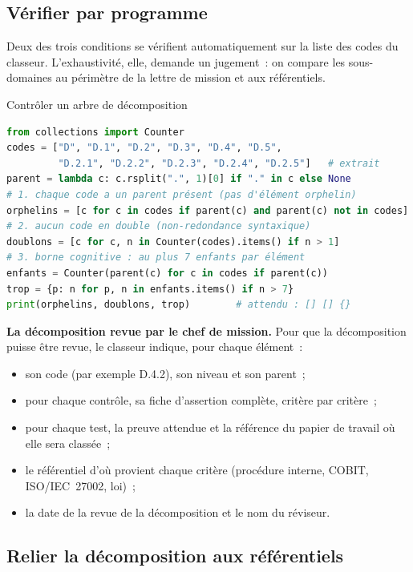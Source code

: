 \subsection{Vérifier par programme}

Deux des trois conditions se vérifient automatiquement sur la liste des
codes du classeur. L'exhaustivité, elle, demande un jugement~: on compare
les sous-domaines au périmètre de la lettre de mission et aux référentiels.

\begin{boxoutils}{Contrôler un arbre de décomposition}
\begin{lstlisting}[language=Python]
from collections import Counter
codes = ["D", "D.1", "D.2", "D.3", "D.4", "D.5",
         "D.2.1", "D.2.2", "D.2.3", "D.2.4", "D.2.5"]   # extrait
parent = lambda c: c.rsplit(".", 1)[0] if "." in c else None
# 1. chaque code a un parent présent (pas d'élément orphelin)
orphelins = [c for c in codes if parent(c) and parent(c) not in codes]
# 2. aucun code en double (non-redondance syntaxique)
doublons = [c for c, n in Counter(codes).items() if n > 1]
# 3. borne cognitive : au plus 7 enfants par élément
enfants = Counter(parent(c) for c in codes if parent(c))
trop = {p: n for p, n in enfants.items() if n > 7}
print(orphelins, doublons, trop)        # attendu : [] [] {}
\end{lstlisting}
\end{boxoutils}

\begin{boxprocedure}
\textbf{La décomposition revue par le chef de mission.} Pour que la
décomposition puisse être revue, le classeur indique, pour chaque élément~:
\begin{itemize}
    \item son code (par exemple D.4.2), son niveau et son parent~;
    \item pour chaque contrôle, sa fiche d'assertion complète, critère par
          critère~;
    \item pour chaque test, la preuve attendue et la référence du papier de
          travail où elle sera classée~;
    \item le référentiel d'où provient chaque critère (procédure interne,
          COBIT, ISO/IEC~27002, loi)~;
    \item la date de la revue de la décomposition et le nom du réviseur.
\end{itemize}
\end{boxprocedure}

\subsection{Relier la décomposition aux référentiels}

